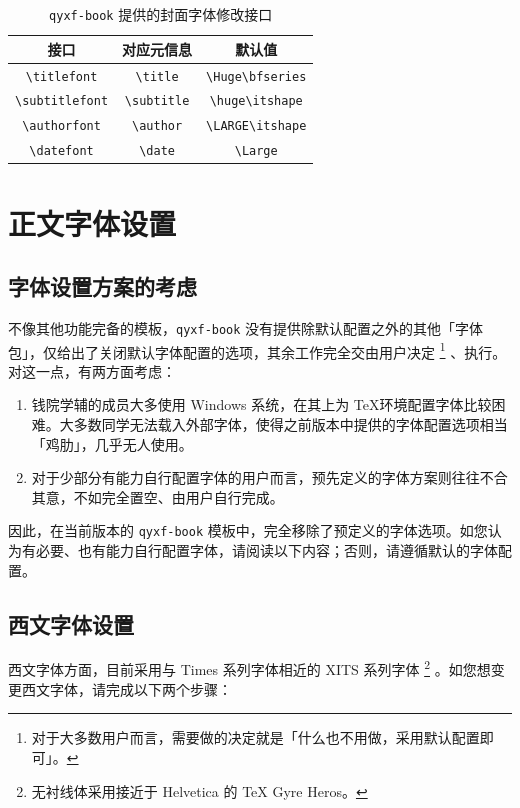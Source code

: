 \documentclass[
  10pt,
  twoside,
  openany,
  b5paper, %
  colorscheme = rbb, %
  xits = false,
]{qyxf-book}
\renewcommand{\titlefont}{\Huge\bfseries}
\renewcommand{\subtitlefont}{\LARGE\itshape}
\begin{document}
\begin{table}[htbp]
  \centering
  \caption{\texttt{qyxf-book} 提供的封面字体修改接口}
  \label{tab:preface-font}
  \begin{tabular}{ccc}
    \toprule
    接口                    & 对应元信息              & 默认值                  \\
    \midrule
    \verb|\titlefont| & \verb|\title| & \verb|\Huge\bfseries| \\
    \verb|\subtitlefont| & \verb|\subtitle| & \verb|\huge\itshape| \\
    \verb|\authorfont| & \verb|\author| & \verb|\LARGE\itshape| \\
    \verb|\datefont| & \verb|\date| & \verb|\Large| \\
    \bottomrule
  \end{tabular}
\end{table}

\section{正文字体设置}

\subsection{字体设置方案的考虑}

不像其他功能完备的模板，\verb|qyxf-book| 没有提供除默认配置之外的其他「字体包」，仅给出了关闭默认字体配置的选项，其余工作完全交由用户决定
\footnote{对于大多数用户而言，需要做的决定就是「什么也不用做，采用默认配置即可」。}
、执行。对这一点，有两方面考虑：
\begin{enumerate}
  \item 钱院学辅的成员大多使用 Windows 系统，在其上为 \TeX 环境配置字体比较困难。大多数同学无法载入外部字体，使得之前版本中提供的字体配置选项相当「鸡肋」，几乎无人使用。
  \item 对于少部分有能力自行配置字体的用户而言，预先定义的字体方案则往往不合其意，不如完全置空、由用户自行完成。
\end{enumerate}
因此，在当前版本的 \verb|qyxf-book| 模板中，完全移除了预定义的字体选项。如您认为有必要、也有能力自行配置字体，请阅读以下内容；否则，请遵循默认的字体配置。

\subsection{西文字体设置}

西文字体方面，目前采用与 Times 系列字体相近的 XITS 系列字体
\footnote{无衬线体采用接近于 Helvetica 的 \TeX{} Gyre Heros。}
。如您想变更西文字体，请完成以下两个步骤：
\end{document}
